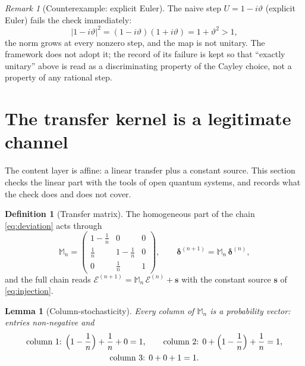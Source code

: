 \documentclass[11pt]{amsbook}
\theoremstyle{plain}
\newtheorem{lemma}[theorem]{Lemma}
\theoremstyle{definition}
\newtheorem{definition}[theorem]{Definition}
\theoremstyle{remark}
\newtheorem{remark}[theorem]{Remark}
\newcommand{\uses}[1]{\par\nopagebreak\noindent{\footnotesize\emph{Uses: #1.}\par}}
\begin{document}
\begin{remark}[Counterexample: explicit Euler]\label{rem:euler}
The naive step $U = 1 - i\vartheta$ (explicit Euler) fails the check immediately:
\begin{equation}\label{eq:euler}
|1 - i\vartheta|^{2} = (1 - i\vartheta)(1 + i\vartheta) = 1 + \vartheta^{2} > 1,
\end{equation}
the norm grows at every nonzero step, and the map is not unitary. The framework does not adopt it; the record of its failure is kept so that ``exactly unitary'' above is read as a discriminating property of the Cayley choice, not a property of any rational step.
\end{remark}

\section{The transfer kernel is a legitimate channel}\label{sec:cptp}

The content layer is affine: a linear transfer plus a constant source. This section checks the linear part with the tools of open quantum systems, and records what the check does and does not cover.

\begin{definition}[Transfer matrix]\label{def:transfer}
The homogeneous part of the chain \cref{eq:deviation} acts through
\begin{equation}\label{eq:transfermatrix}
\mathbb{M}_{n} =
\begin{pmatrix}
1 - \frac{1}{n} & 0 & 0\\[4pt]
\frac{1}{n} & 1 - \frac{1}{n} & 0\\[4pt]
0 & \frac{1}{n} & 1
\end{pmatrix},
\qquad
\boldsymbol{\delta}^{(n+1)} = \mathbb{M}_{n}\,\boldsymbol{\delta}^{(n)},
\end{equation}
and the full chain reads $\boldsymbol{\mathcal E}^{(n+1)} = \mathbb{M}_{n}\,\boldsymbol{\mathcal E}^{(n)} + \boldsymbol{s}$ with the constant source $\boldsymbol{s}$ of \cref{eq:injection}.
\end{definition}

\begin{lemma}[Column-stochasticity]\label{lem:stochastic}
Every column of $\mathbb{M}_{n}$ is a probability vector: entries non-negative and
\begin{equation}\label{eq:stochastic}
\begin{gathered}
\text{column 1: } \Bigl(1 - \frac{1}{n}\Bigr) + \frac{1}{n} + 0 = 1,
\qquad
\text{column 2: } 0 + \Bigl(1 - \frac{1}{n}\Bigr) + \frac{1}{n} = 1,\\
\text{column 3: } 0 + 0 + 1 = 1.
\end{gathered}
\end{equation}
\uses{\cref{eq:transfermatrix}}
\end{lemma}
\end{document}
